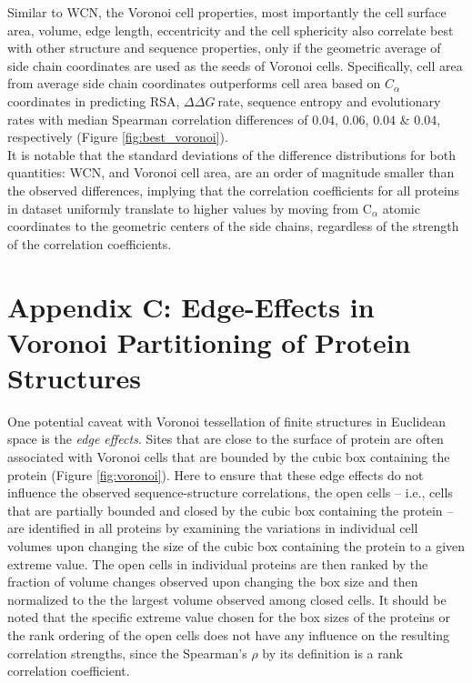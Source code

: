 \documentclass[11pt]{article}
\newcommand{\ddg}{$\Delta\Delta G~$}
\begin{document}
    Similar to WCN, the Voronoi cell properties, most importantly the cell surface area, volume, edge length, eccentricity and the cell sphericity also correlate best with other structure and sequence properties, only if the geometric average of side chain coordinates are used as the seeds of Voronoi cells. Specifically, cell area from average side chain coordinates outperforms cell area based on $C_\alpha$ coordinates in predicting RSA, \ddg rate, sequence entropy and evolutionary rates with median Spearman correlation differences of $0.04$, $0.06$, $0.04$ \& $0.04$, respectively (Figure \ref{fig:best_voronoi}). \\

    It is notable that the standard deviations of the difference distributions for both quantities: WCN, and Voronoi cell area, are an order of magnitude smaller than the observed differences, implying that the correlation coefficients for all proteins in dataset uniformly translate to higher values by moving from C$_\alpha$ atomic coordinates to the geometric centers of the side chains, regardless of the strength of the correlation coefficients. \\

\section{Appendix C: Edge-Effects in Voronoi Partitioning of Protein Structures}
\label{app:edge_effects}

    One potential caveat with Voronoi tessellation of finite structures in Euclidean space is the {\it edge effects}. Sites that are close to the surface of protein are often associated with Voronoi cells that are bounded by the cubic box containing the protein (Figure \ref{fig:voronoi}). Here to ensure that these edge effects do not influence the observed sequence-structure correlations, the open cells -- i.e., cells that are partially bounded and closed by the cubic box containing the protein -- are identified in all proteins by examining the variations in individual cell volumes upon changing the size of the cubic box containing the protein to a given extreme value. The open cells in individual proteins are then ranked by the fraction of volume changes observed upon changing the box size and then normalized to the the largest volume observed among closed cells. It should be noted that the specific extreme value chosen for the box sizes of the proteins or the rank ordering of the open cells does not have any influence on the resulting correlation strengths, since the Spearman's $\rho$ by its definition is a rank correlation coefficient. \\
\end{document}
